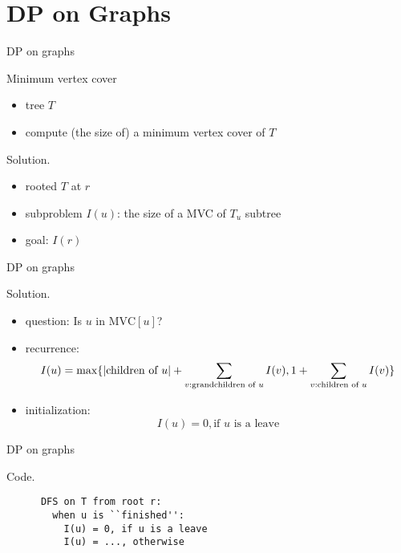 \section{DP on Graphs}

\begin{frame}{DP on graphs}
  \begin{exampleblock}{Minimum vertex cover }
    \begin{itemize}
      \item tree $T$
      \item compute (the size of) a minimum vertex cover of $T$
    \end{itemize}

  \end{exampleblock}

  \begin{block}{Solution.}
    \begin{itemize}
      \item rooted $T$ at $r$
      \item subproblem $I(u)$: the size of a MVC of $T_{u}$ subtree
      \item goal: $I(r)$
    \end{itemize}
  \end{block}
\end{frame}
\begin{frame}{DP on graphs}
  \begin{block}{Solution.}
    \begin{itemize}
      \item question: Is $u$ in $\text{MVC}[u]$?
      \item recurrence:
	\[
	  I(u) = \max \{|\text{children of } u| + \sum_{v: \text{grandchildren of } u} I(v), 1 + \sum_{v: \text{children of } u} I(v)\}
	\]
      \item initialization: 
	\[
	  I(u) = 0, \text{if } u \text{ is a leave}
	\]
    \end{itemize}
  \end{block}
\end{frame}
\begin{frame}[fragile]{DP on graphs}
  \begin{block}{Code.}
    \begin{verbatim}
      DFS on T from root r:
        when u is ``finished'': 
          I(u) = 0, if u is a leave
          I(u) = ..., otherwise
    \end{verbatim}
  \end{block}
\end{frame}
